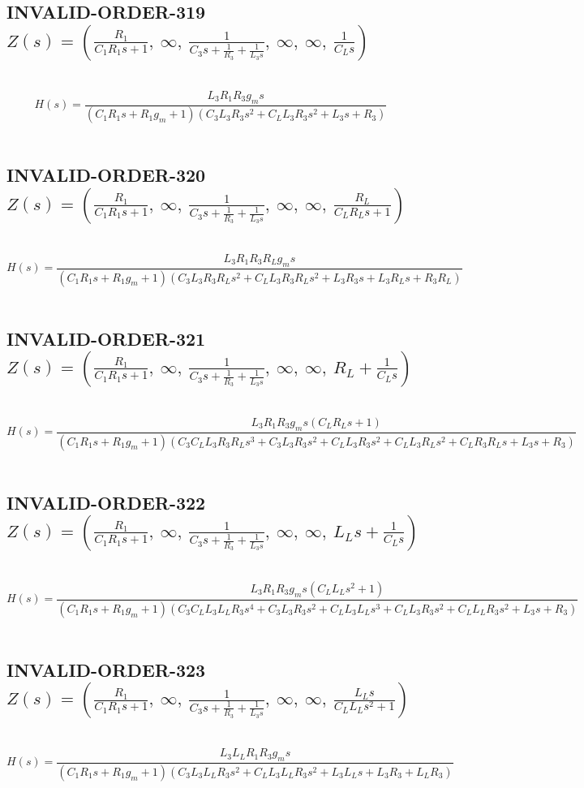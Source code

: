 \documentclass{article}
\begin{document}
\subsection{INVALID-ORDER-319 $Z(s) = \left( \frac{R_{1}}{C_{1} R_{1} s + 1}, \  \infty, \  \frac{1}{C_{3} s + \frac{1}{R_{3}} + \frac{1}{L_{3} s}}, \  \infty, \  \infty, \  \frac{1}{C_{L} s}\right)$ } \ 
\textbf{\[H(s) = \frac{L_{3} R_{1} R_{3} g_{m} s}{\left(C_{1} R_{1} s + R_{1} g_{m} + 1\right) \left(C_{3} L_{3} R_{3} s^{2} + C_{L} L_{3} R_{3} s^{2} + L_{3} s + R_{3}\right)}\] } \ 
\subsection{INVALID-ORDER-320 $Z(s) = \left( \frac{R_{1}}{C_{1} R_{1} s + 1}, \  \infty, \  \frac{1}{C_{3} s + \frac{1}{R_{3}} + \frac{1}{L_{3} s}}, \  \infty, \  \infty, \  \frac{R_{L}}{C_{L} R_{L} s + 1}\right)$ } \ 
\textbf{\[H(s) = \frac{L_{3} R_{1} R_{3} R_{L} g_{m} s}{\left(C_{1} R_{1} s + R_{1} g_{m} + 1\right) \left(C_{3} L_{3} R_{3} R_{L} s^{2} + C_{L} L_{3} R_{3} R_{L} s^{2} + L_{3} R_{3} s + L_{3} R_{L} s + R_{3} R_{L}\right)}\] } \ 
\subsection{INVALID-ORDER-321 $Z(s) = \left( \frac{R_{1}}{C_{1} R_{1} s + 1}, \  \infty, \  \frac{1}{C_{3} s + \frac{1}{R_{3}} + \frac{1}{L_{3} s}}, \  \infty, \  \infty, \  R_{L} + \frac{1}{C_{L} s}\right)$ } \ 
\textbf{\[H(s) = \frac{L_{3} R_{1} R_{3} g_{m} s \left(C_{L} R_{L} s + 1\right)}{\left(C_{1} R_{1} s + R_{1} g_{m} + 1\right) \left(C_{3} C_{L} L_{3} R_{3} R_{L} s^{3} + C_{3} L_{3} R_{3} s^{2} + C_{L} L_{3} R_{3} s^{2} + C_{L} L_{3} R_{L} s^{2} + C_{L} R_{3} R_{L} s + L_{3} s + R_{3}\right)}\] } \ 
\subsection{INVALID-ORDER-322 $Z(s) = \left( \frac{R_{1}}{C_{1} R_{1} s + 1}, \  \infty, \  \frac{1}{C_{3} s + \frac{1}{R_{3}} + \frac{1}{L_{3} s}}, \  \infty, \  \infty, \  L_{L} s + \frac{1}{C_{L} s}\right)$ } \ 
\textbf{\[H(s) = \frac{L_{3} R_{1} R_{3} g_{m} s \left(C_{L} L_{L} s^{2} + 1\right)}{\left(C_{1} R_{1} s + R_{1} g_{m} + 1\right) \left(C_{3} C_{L} L_{3} L_{L} R_{3} s^{4} + C_{3} L_{3} R_{3} s^{2} + C_{L} L_{3} L_{L} s^{3} + C_{L} L_{3} R_{3} s^{2} + C_{L} L_{L} R_{3} s^{2} + L_{3} s + R_{3}\right)}\] } \ 
\subsection{INVALID-ORDER-323 $Z(s) = \left( \frac{R_{1}}{C_{1} R_{1} s + 1}, \  \infty, \  \frac{1}{C_{3} s + \frac{1}{R_{3}} + \frac{1}{L_{3} s}}, \  \infty, \  \infty, \  \frac{L_{L} s}{C_{L} L_{L} s^{2} + 1}\right)$ } \ 
\textbf{\[H(s) = \frac{L_{3} L_{L} R_{1} R_{3} g_{m} s}{\left(C_{1} R_{1} s + R_{1} g_{m} + 1\right) \left(C_{3} L_{3} L_{L} R_{3} s^{2} + C_{L} L_{3} L_{L} R_{3} s^{2} + L_{3} L_{L} s + L_{3} R_{3} + L_{L} R_{3}\right)}\] } \ 
\end{document}
